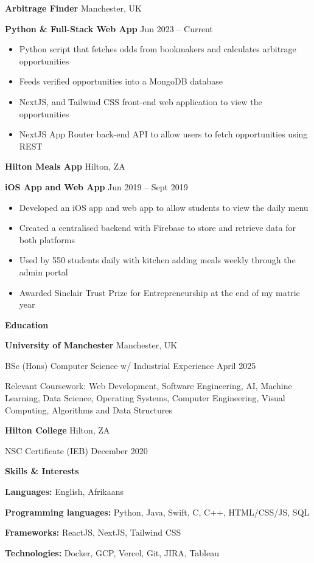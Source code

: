 \documentclass[11pt]{article}
\begin{document}
\textbf{Arbitrage Finder} \hfill Manchester, UK

\textbf{Python \& Full-Stack Web App} \hfill Jun 2023 – Current
\begin{itemize}[noitemsep, topsep=0pt, partopsep=0pt, parsep=0pt]
    \item Python script that fetches odds from bookmakers and calculates arbitrage opportunities
    \item Feeds verified opportunities into a MongoDB database
    \item NextJS, and Tailwind CSS front-end web application to view the opportunities
    \item NextJS App Router back-end API to allow users to fetch opportunities using REST
\end{itemize}

\vspace{12pt}

\textbf{Hilton Meals App} \hfill Hilton, ZA

\textbf{iOS App and Web App} \hfill Jun 2019 – Sept 2019
\begin{itemize}[noitemsep, topsep=0pt, partopsep=0pt, parsep=0pt]
    \item Developed an iOS app and web app to allow students to view the daily menu
    \item Created a centralised backend with Firebase to store and retrieve data for both platforms
    \item Used by 550 students daily with kitchen adding meals weekly through the admin portal
    \item Awarded Sinclair Trust Prize for Entrepreneurship at the end of my matric year
\end{itemize}

\vspace{12pt}

\begin{center}
    \textbf{Education}
\end{center}
\textbf{University of Manchester} \hfill Manchester, UK

BSc (Hons) Computer Science w/ Industrial Experience \hfill April 2025

Relevant Coursework: Web Development, Software Engineering, AI, Machine Learning, Data Science, Operating Systems, Computer Engineering, Visual Computing, Algorithms and Data Structures

\vspace{12pt}

\textbf{Hilton College} \hfill	Hilton, ZA

NSC Certificate (IEB) \hfill December 2020

\vspace{12pt}

\begin{center}
    \textbf{Skills \& Interests}
\end{center}

\textbf{Languages:} English, Afrikaans

\textbf{Programming languages:} Python, Java, Swift, C, C++, HTML/CSS/JS, SQL

\textbf{Frameworks:} ReactJS, NextJS, Tailwind CSS

\textbf{Technologies:} Docker, GCP, Vercel, Git, JIRA, Tableau
\end{document}

